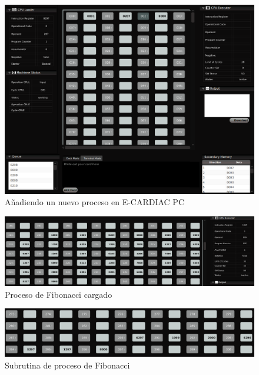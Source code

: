 \documentclass[letterpaper,12pt,oneside]{book}
\begin{document}
	       \begin{figure}[h]		
				\centering
				\includegraphics[scale=0.35]{media/Paralela/vm_adding_new_process_fibonacci_cut.png}
				\caption{Añadiendo un nuevo proceso en E-CARDIAC PC}
				\label{fig:vm_adding_new_process_fibonacci}
			\end{figure}			
   
            \begin{figure}[H]		
				\centering
				\includegraphics[scale=0.3]{media/Paralela/vm_process_fibonacci_loaded_cut.png}
				\caption{Proceso de Fibonacci cargado}
				\label{fig:vm_process_fibonacci_loaded}
			\end{figure}
			
			\begin{figure}[H]		
				\centering
				\includegraphics[scale=0.35]{media/Paralela/vm_subrutine_fibonacci_cut.png}
				\caption{Subrutina de proceso de Fibonacci}
				\label{fig:vm_subrutine_fibonacci}
			\end{figure}
			
\end{document}
